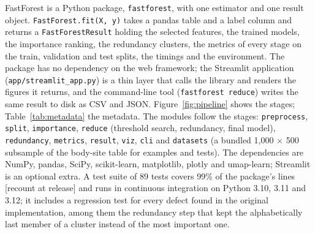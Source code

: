 \documentclass[11pt,a4paper]{article}
\newcommand{\authnote}[1]{{\color{notecolor}\small [#1]}}
\begin{document}
FastForest is a Python package, \texttt{fastforest}, with one estimator and one result object. \texttt{FastForest.fit(X, y)} takes a pandas table and a label column and returns a \texttt{FastForestResult} holding the selected features, the trained models, the importance ranking, the redundancy clusters, the metrics of every stage on the train, validation and test splits, the timings and the environment. The package has no dependency on the web framework; the Streamlit application (\texttt{app/streamlit\_app.py}) is a thin layer that calls the library and renders the figures it returns, and the command-line tool (\texttt{fastforest reduce}) writes the same result to disk as CSV and JSON. Figure~\ref{fig:pipeline} shows the stages; Table~\ref{tab:metadata} the metadata. The modules follow the stages: \texttt{preprocess}, \texttt{split}, \texttt{importance}, \texttt{reduce} (threshold search, redundancy, final model), \texttt{redundancy}, \texttt{metrics}, \texttt{result}, \texttt{viz}, \texttt{cli} and \texttt{datasets} (a bundled 1,000 $\times$ 500 subsample of the body-site table for examples and tests). The dependencies are NumPy, pandas, SciPy, scikit-learn, matplotlib, plotly and umap-learn; Streamlit is an optional extra. A test suite of 89 tests covers 99\% of the package's lines \authnote{recount at release} and runs in continuous integration on Python 3.10, 3.11 and 3.12; it includes a regression test for every defect found in the original implementation, among them the redundancy step that kept the alphabetically last member of a cluster instead of the most important one.
\end{document}
